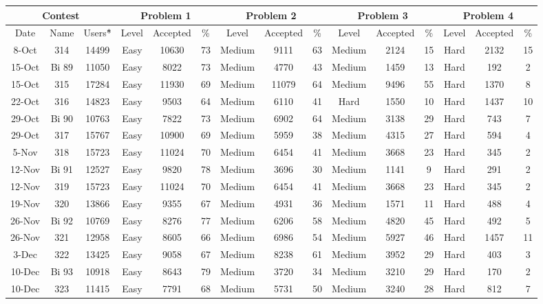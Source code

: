 \begin{table}[h]
\centering
\tiny
\begin{tabular}{ccc|ccc|ccc|ccc|ccc}
\hline
\multicolumn{3}{c|}{Contest} &  \multicolumn{3}{c|}{Problem 1} & \multicolumn{3}{c|}{Problem 2} & \multicolumn{3}{c|}{Problem 3} & \multicolumn{3}{c}{Problem 4}\\
\hline
Date & Name & Users\^* & Level & Accepted & \% & Level & Accepted & \% & Level & Accepted & \% & Level & Accepted & \% \\
\hline
8-Oct & 314 & 14499  & Easy & 10630 & 73 & Medium & 9111 & 63 & Medium & 2124 & 15 & Hard & 2132 & 15 \\
15-Oct & Bi 89 & 11050  & Easy & 8022 & 73 & Medium & 4770 & 43 & Medium & 1459 & 13 & Hard & 192 & 2 \\
15-Oct &  315 & 17284  & Easy & 11930 & 69 & Medium & 11079 & 64 & Medium & 9496 & 55 & Hard & 1370 & 8 \\
22-Oct &  316 & 14823  & Easy & 9503 & 64 & Medium & 6110 & 41 & Hard & 1550 & 10 & Hard & 1437 & 10 \\
29-Oct & Bi 90 & 10763  & Easy & 7822 & 73 & Medium & 6902 & 64 & Medium & 3138 & 29 & Hard & 743 & 7 \\
29-Oct &  317 & 15767  & Easy & 10900 & 69 & Medium & 5959 & 38 & Medium & 4315 & 27 & Hard & 594 & 4 \\
5-Nov &  318 & 15723  & Easy & 11024 & 70 & Medium & 6454 & 41 & Medium & 3668 & 23 & Hard & 345 & 2 \\
12-Nov & Bi 91 & 12527  & Easy & 9820 & 78 & Medium & 3696 & 30 & Medium & 1141 & 9 & Hard & 291 & 2 \\
12-Nov &  319 & 15723  & Easy & 11024 & 70 & Medium & 6454 & 41 & Medium & 3668 & 23 & Hard & 345 & 2 \\
19-Nov &  320 & 13866  & Easy & 9355 & 67 & Medium & 4931 & 36 & Medium & 1571 & 11 & Hard & 488 & 4 \\
26-Nov & Bi 92 & 10769  & Easy & 8276 & 77 & Medium & 6206 & 58 & Medium & 4820 & 45 & Hard & 492 & 5 \\
26-Nov &  321 & 12958  & Easy & 8605 & 66 & Medium & 6986 & 54 & Medium & 5927 & 46 & Hard & 1457 & 11 \\
3-Dec &  322 & 13425  & Easy & 9058 & 67 & Medium & 8238 & 61 & Medium & 3952 & 29 & Hard & 403 & 3 \\
10-Dec & Bi 93 & 10918  & Easy & 8643 & 79 & Medium & 3720 & 34 & Medium & 3210 & 29 & Hard & 170 & 2 \\
10-Dec & 323 & 11415  & Easy & 7791 & 68 & Medium & 5731 & 50 & Medium & 3240 & 28 & Hard & 812 & 7 \\

\end{tabular}
\end{table}
